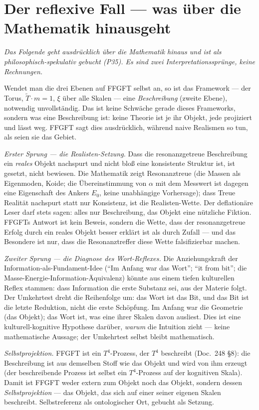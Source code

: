 \section{Der reflexive Fall --- was über die Mathematik hinausgeht}

\emph{Das Folgende geht ausdrücklich über die Mathematik hinaus und ist als
philosophisch-spekulativ gebucht (P35). Es sind zwei Interpretationssprünge, keine
Rechnungen.}

Wendet man die drei Ebenen auf FFGFT selbst an, so ist das Framework --- der Torus,
$\tilde{T}\cdot m=1$, $\xi$ über alle Skalen --- eine \emph{Beschreibung} (zweite
Ebene), notwendig unvollständig. Das ist keine Schwäche gerade dieses Frameworks,
sondern was eine Beschreibung ist: keine Theorie ist je ihr Objekt, jede projiziert
und lässt weg. FFGFT sagt dies ausdrücklich, während naive Realismen so tun, als
seien sie das Gebiet.

\emph{Erster Sprung --- die Realisten-Setzung.} Dass die resonanzgetreue
Beschreibung ein \emph{reales} Objekt nachspurt und nicht bloß eine konsistente
Struktur ist, ist gesetzt, nicht bewiesen. Die Mathematik zeigt Resonanztreue
(die Massen als Eigenmoden, Koide; die Übereinstimmung von $\alpha$ mit dem
Messwert ist dagegen eine Eigenschaft des Ankers $E_0$, keine unabhängige
Vorhersage); dass Treue Realität
nachspurt statt nur Konsistenz, ist die Realisten-Wette. Der deflationäre Leser darf
stets sagen: alles nur Beschreibung, das Objekt eine nützliche Fiktion. FFGFTs
Antwort ist kein Beweis, sondern die Wette, dass der resonanzgetreue Erfolg durch
ein reales Objekt besser erklärt ist als durch Zufall --- und das Besondere ist nur,
dass die Resonanztreffer diese Wette falsifizierbar machen.

\emph{Zweiter Sprung --- die Diagnose des Wort-Reflexes.} Die Anziehungskraft der
Information-als-Fundament-Idee (\enquote{Im Anfang war das Wort}; \enquote{it from
bit}; die Masse-Energie-Information-Äquivalenz) könnte aus einem tiefen kulturellen
Reflex stammen: dass Information die erste Substanz sei, aus der Materie folgt. Der
Umkehrtest dreht die Reihenfolge um: das Wort ist das Bit, und das Bit ist die
letzte Reduktion, nicht die erste Schöpfung. Im Anfang war die Geometrie (das
Objekt); das Wort ist, was eine ihrer Skalen davon ausliest. Dies ist eine
kulturell-kognitive Hypothese darüber, \emph{warum} die Intuition zieht --- keine
mathematische Aussage; der Umkehrtest selbst bleibt mathematisch.

\emph{Selbstprojektion.} FFGFT ist ein $T^4$-Prozess, der $T^4$ beschreibt
(Doc.~248 §8): die Beschreibung ist aus demselben Stoff wie das Objekt und wird von
ihm erzeugt (der beschreibende Prozess ist selbst ein $T^4$-Prozess auf der
kognitiven Skala). Damit ist FFGFT weder extern zum Objekt noch das Objekt, sondern
dessen \emph{Selbstprojektion} --- das Objekt, das sich auf einer seiner eigenen
Skalen beschreibt. Selbstreferenz als ontologischer Ort, gebucht als Setzung.

